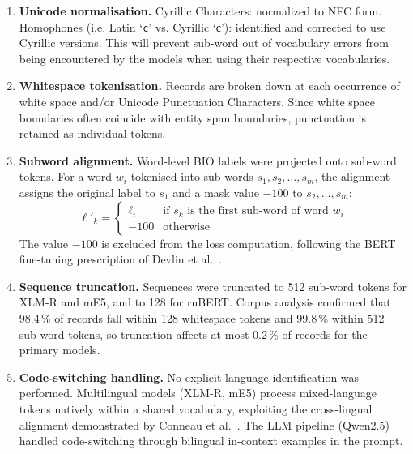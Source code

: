 \begin{enumerate}
  \item \textbf{Unicode normalisation.} Cyrillic Characters: normalized to NFC form. Homophones (i.e. Latin `\texttt{c}' vs. Cyrillic  `\foreignlanguage{russian}{с}'): identified and corrected to use Cyrillic versions. This will prevent sub-word out of vocabulary errors from being encountered by the models when using their respective vocabularies.

  \item \textbf{Whitespace tokenisation.} Records are broken down at each occurrence of white space and/or Unicode Punctuation Characters. Since white space boundaries often coincide with entity span boundaries, punctuation is retained as individual tokens.

  \item \textbf{Subword alignment.} Word-level BIO labels were projected onto sub-word tokens. For a word $w_i$ tokenised into sub-words $s_1, s_2, \ldots, s_m$, the alignment assigns the original label to $s_1$ and a mask value $-100$ to $s_2, \ldots, s_m$:
  \begin{equation}
    \ell'_k =
    \begin{cases}
      \ell_i & \text{if } s_k \text{ is the first sub-word of word } w_i \\
      -100   & \text{otherwise}
    \end{cases}
    \label{eq:subword_align}
  \end{equation}
  The value $-100$ is excluded from the loss computation, following the BERT fine-tuning prescription of Devlin et al.~\cite{devlin2019bert}.

  \item \textbf{Sequence truncation.} Sequences were truncated to 512 sub-word tokens for XLM-R and mE5, and to 128 for ruBERT. Corpus analysis confirmed that 98.4\,\% of records fall within 128 whitespace tokens and 99.8\,\% within 512 sub-word tokens, so truncation affects at most 0.2\,\% of records for the primary models.

  \item \textbf{Code-switching handling.} No explicit language identification was performed. Multilingual models (XLM-R, mE5) process mixed-language tokens natively within a shared vocabulary, exploiting the cross-lingual alignment demonstrated by Conneau et al.~\cite{conneau2020xlmr}. The LLM pipeline (Qwen2.5) handled code-switching through bilingual in-context examples in the prompt.
\end{enumerate}

